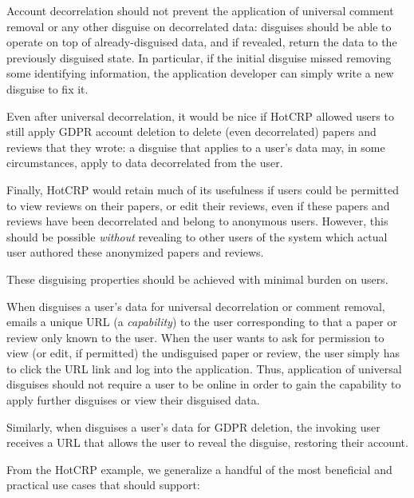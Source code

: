 Account decorrelation should not prevent the application of universal comment removal
or any other disguise on decorrelated data: disguises should be able to operate on top of
already-disguised data, and if revealed, return the data to the previously disguised state. 
In particular, if the initial disguise missed removing some identifying information, the
application developer can simply write a new disguise to fix it.

Even after universal decorrelation, it would be nice if HotCRP allowed users to still apply GDPR
account deletion to delete (even decorrelated) papers and reviews that they wrote: a disguise that
applies to a user's data may, in some circumstances, apply to data decorrelated from the user.

Finally, HotCRP would retain much of its usefulness if users could be permitted to view reviews on
their papers, or edit their reviews, even if these papers and reviews have been decorrelated and
belong to anonymous users.  However, this should be possible \emph{without} revealing to other users
of the system which actual user authored these anonymized papers and reviews.

 These disguising properties should be achieved with minimal burden on
users. 

When \sys disguises a user's data for universal decorrelation or comment removal, \sys emails a
unique URL (a \emph{capability}) to the user corresponding to that a paper or review only known to
the user. When the user wants to ask for permission to view (or edit, if permitted) the undisguised
paper or review, the user simply has to click the URL link and log into the application. Thus,
application of universal disguises should not require a user to be online in order to gain the
capability to apply further disguises or view their disguised data.

Similarly, when \sys disguises a user's data for GDPR deletion, the invoking user receives a URL
that allows the user to reveal the disguise, restoring their account.

From the HotCRP example, we generalize a handful of the most beneficial and practical use cases
that \sys should support:

